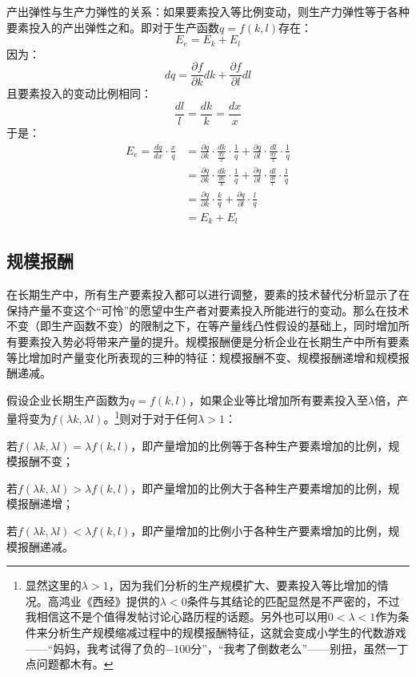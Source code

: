 产出弹性与生产力弹性的关系：如果要素投入等比例变动，则生产力弹性等于各种要素投入的产出弹性之和。即对于生产函数$q=f(k,l)$存在：
\begin{equation}
E_e = E_k + E_l
\label{eq:chanchutanxing-shengchanlitanxing-guanxi}
\end{equation}
因为：
\[
dq = \frac{{\partial f}}{{\partial k}}dk + \frac{{\partial f}}{{\partial l}}dl
\]
且要素投入的变动比例相同：
\[\frac{{dl}}{l} = \frac{{dk}}{k} = \frac{{dx}}{x}\]
于是：
\begin{equation}
\begin{split}
{E_e} = \frac{{dq}}{{dx}}\cdot\frac{x}{q} &= \frac{{\partial q}}{{\partial k}}\cdot\frac{{dk}}{{\frac{{dx}}{x}}}\cdot\frac{1}{q} + \frac{{\partial q}}{{\partial l}}\cdot\frac{{dl}}{{\frac{{dx}}{x}}}\cdot\frac{1}{q}\\
 &= \frac{{\partial q}}{{\partial k}}\cdot\frac{{dk}}{{\frac{{dk}}{k}}}\cdot\frac{1}{q} + \frac{{\partial q}}{{\partial l}}\cdot\frac{{dl}}{{\frac{{dl}}{l}}}\cdot\frac{1}{q}\\
 &= \frac{{\partial q}}{{\partial k}}\cdot\frac{k}{q} + \frac{{\partial q}}{{\partial l}}\cdot\frac{l}{q}\\
 &= {E_k} + {E_l}
\end{split}
\end{equation}

\subsection{规模报酬}
在长期生产中，所有生产要素投入都可以进行调整，要素的技术替代分析显示了在保持产量不变这个“可怜”的愿望中生产者对要素投入所能进行的变动。那么在技术不变（即生产函数不变）的限制之下，在等产量线凸性假设的基础上，同时增加所有要素投入势必将带来产量的提升。规模报酬便是分析企业在长期生产中所有要素等比增加时产量变化所表现的三种的特征：规模报酬不变、规模报酬递增和规模报酬递减。

假设企业长期生产函数为$q=f(k,l)$，如果企业等比增加所有要素投入至$\lambda$倍，产量将变为$f(\lambda k,\lambda l)$。\footnote{%
显然这里的$\lambda > 1$，因为我们分析的生产规模扩大、要素投入等比增加的情况。高鸿业《西经》提供的$\lambda<0$条件与其结论的匹配显然是不严密的，不过我相信这不是个值得发帖讨论心路历程的话题。另外也可以用$0<\lambda<1$作为条件来分析生产规模缩减过程中的规模报酬特征，这就会变成小学生的代数游戏——“妈妈，我考试得了负的$-100$分”，“我考了倒数老么”——别扭，虽然一丁点问题都木有。}则对于对于任何$\lambda > 1$：
\begin{compactitem}
\item {}%
若$f(\lambda k,\lambda l) = \lambda f(k,l)$，即产量增加的比例等于各种生产要素增加的比例，规模报酬不变；
\item {}%
若$f(\lambda k,\lambda l) > \lambda f(k,l)$，即产量增加的比例大于各种生产要素增加的比例，规模报酬递增；
\item {}%
若$f(\lambda k,\lambda l) < \lambda f(k,l)$，即产量增加的比例小于各种生产要素增加的比例，规模报酬递减。
\end{compactitem}

